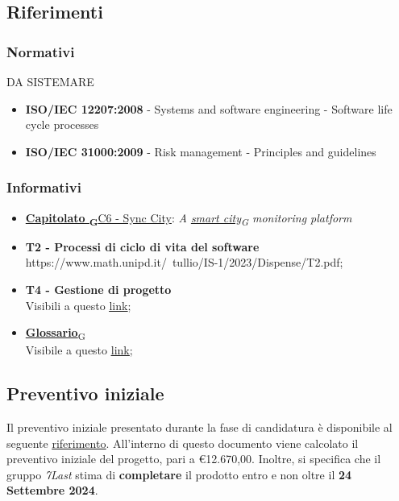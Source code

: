 \subsection{Riferimenti}
    \subsubsection{Normativi}DA SISTEMARE
        \begin{itemize}
            \item \textbf{ISO/IEC 12207:2008} - Systems and software engineering - Software life cycle processes
            \item \textbf{ISO/IEC 31000:2009} - Risk management - Principles and guidelines
        \end{itemize}
    \subsubsection{Informativi}
        \begin{itemize}
            \item \href{https://7last.github.io/docs/rtb/documentazione-interna/glossario\#capitolato}{\textbf{Capitolato \textsubscript{G}}C6 - Sync City}: \textit{A \href{https://7last.github.io/docs/rtb/documentazione-interna/glossario\#smart-city}{smart city\textsubscript{G}} monitoring platform}
            \item \textbf{T2 - Processi di ciclo di vita del software}\\ https://www.math.unipd.it/~tullio/IS-1/2023/Dispense/T2.pdf;
            \item \textbf{T4 - Gestione di progetto}\\ Visibili a questo \uline{\href{https://www.math.unipd.it/~tullio/IS-1/2023/Dispense/T4.pdf}{link}};
            \item \href{https://7last.github.io/docs/rtb/documentazione-interna/glossario\#glossario}{\textbf{Glossario}\textsubscript{G}}\\ Visibile a questo \uline{\href{https://7last.github.io/docs/rtb/documentazione-interna/glossario}{link}};
        \end{itemize}
\subsection{Preventivo iniziale}
Il preventivo iniziale presentato durante la fase di candidatura è disponibile al seguente \uline{\href{https://github.com/7Last/docs/blob/main/1_candidatura/preventivo_costi_assunzione_impegni_v2.0.pdf}{riferimento}}. All'interno di questo documento viene calcolato il preventivo iniziale del progetto, pari a €12.670,00. Inoltre, si specifica che il gruppo \textit{7Last} stima di \textbf{completare} il prodotto entro e non oltre il \textbf{24 Settembre 2024}.